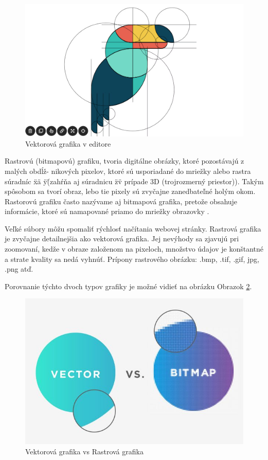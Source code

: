 \begin{figure}[!htbp]
    \centering
    \includegraphics[width=12cm]{img/Vector.PNG}
    \caption{Vektorová grafika v editore \cite{c21}}
    \label{Vector}
\end{figure}

Rastrovú (bitmapovú) grafiku, tvoria digitálne obrázky, ktoré pozostávajú z malých obdĺž- nikových pixelov, ktoré sú usporiadané do mriežky alebo rastra súradníc \"x\" a \"y\"(zahŕňa aj súradnicu \"z\" v prípade 3D (trojrozmerný priestor)). Takým spôsobom sa tvorí obraz, lebo tie pixely sú zvyčajne zanedbateľné holým okom. Rastorovú grafiku často nazývame aj bitmapová grafika, pretože obsahuje informácie, ktoré sú namapované priamo do mriežky obrazovky \cite{c18}.

Veľké súbory môžu spomaliť rýchlosť načítania webovej stránky. Rastrová grafika je zvyčajne detailnejšia ako vektorová grafika. Jej nevýhody sa zjavujú pri zoomovaní, kedže v obraze založenom na pixeloch, množstvo údajov je konštantné a strate kvality sa nedá vyhnúť. Prípony rastrového obrázku: .bmp, .tif, .gif, jpg, .png atď.

\noindent Porovnanie týchto dvoch typov grafiky je možné vidieť na obrázku Obrazok \ref{VectorvsRaster}.

\begin{figure}[!htbp]
    \centering
    \includegraphics[width=12cm]{img/Vector vs Raster.jpeg}
    \caption{Vektorová grafika vs Rastrová grafika \cite{c20}}
    \label{VectorvsRaster}
\end{figure}

